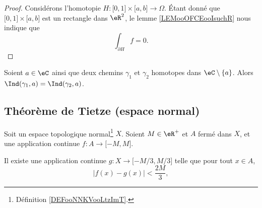 \begin{proof}
	Considérons l'homotopie \( H\colon \mathopen[ 0 , 1 \mathclose]\times \mathopen[ a , b \mathclose]\to \Omega\). Étant donné que \( \mathopen[ 0 ,1  \mathclose]\times \mathopen[ a , b \mathclose]\) est un rectangle dans \( \eR^2\), le lemme \ref{LEMooOFCEooIsuchR} nous indique que
	\begin{equation}
		\int_{\partial H}f=0.
	\end{equation}
\end{proof}

\begin{corollary}   \label{CorGZXzuZR}
	Soient \( a\in \eC\) ainsi que deux chemins \( \gamma_1\) et \( \gamma_2\) homotopes dans \( \eC\setminus\{ a \}\). Alors \( \Ind(\gamma_1,a)=\Ind(\gamma_2,a)\).
\end{corollary}



\subsection{Théorème de Tietze (espace normal)}

\begin{lemma}     \label{LEMooCLVAooTaNGJk}
	Soit un espace topologique normal\footnote{Définition \ref{DEFooNNKVooLtzImT}.} \( X\). Soient \( M\in \eR^+\) et \( A\) fermé dans \( X\), et une application continue \( f\colon A\to \mathopen[ -M , M \mathclose]\).

	Il existe une application continue \( g\colon X\to \mathopen[ -M/3 , M/3 \mathclose]\) telle que pour tout \( x\in A\),
	\begin{equation}
		| f(x)-g(x) |<\frac{ 2M }{ 3 },
	\end{equation}
\end{lemma}

